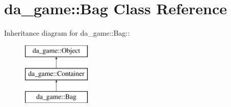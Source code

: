 \hypertarget{classda__game_1_1Bag}{
\section{da\_\-game::Bag Class Reference}
\label{classda__game_1_1Bag}
}
Inheritance diagram for da\_\-game::Bag::\begin{figure}[H]
\begin{center}
\leavevmode
\includegraphics[height=3cm]{classda__game_1_1Bag}
\end{center}
\end{figure}
